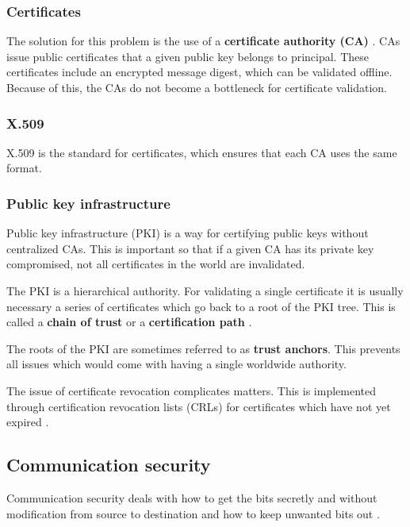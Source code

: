 \subsubsection{Certificates}

The solution for this problem is the use of a \textbf{certificate authority (CA)} \cite[p.~807]{computer-networks-tanenbaum-2012}.
CAs issue public certificates that a given public key belongs to principal.
These certificates include an encrypted message digest, which can be validated offline.
Because of this, the CAs do not become a bottleneck for certificate validation.

\subsubsection{X.509}

X.509 is the standard for certificates, which ensures that each CA uses the same format.

\subsubsection{Public key infrastructure}

Public key infrastructure (PKI) is a way for certifying public keys without centralized CAs.
This is important so that if a given CA has its private key compromised, not all certificates in the world are invalidated.

The PKI is a hierarchical authority.
For validating a single certificate it is usually necessary a series of certificates which go back to a root of the PKI tree.
This is called a \textbf{chain of trust} or a \textbf{certification path} \cite[p.~812]{computer-networks-tanenbaum-2012}.

The roots of the PKI are sometimes referred to as \textbf{trust anchors}.
This prevents all issues which would come with having a single worldwide authority.

The issue of certificate revocation complicates matters.
This is implemented through certification revocation lists (CRLs) for certificates which have not yet expired \cite[p.~813]{computer-networks-tanenbaum-2012}.

\subsection{Communication security}

Communication security deals with how to get the bits secretly and without modification from source to destination and how to keep unwanted bits out \cite[p.~813]{computer-networks-tanenbaum-2012}.


